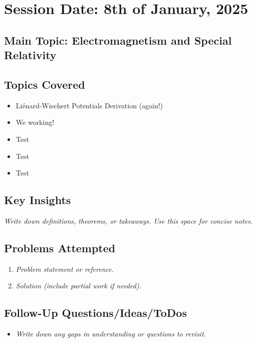 \section{Session Date: 8th of January, 2025}
\subsection*{Main Topic: Electromagnetism and Special Relativity}
\subsection*{Topics Covered}
\begin{itemize}
    \item Liénard-Wiechert Potentials Derivation (again!) 
    \item We working!
    \item Test
    \item Test
    \item Test
\end{itemize}

\subsection*{Key Insights}
\textit{Write down definitions, theorems, or takeaways. Use this space for concise notes.}

\subsection*{Problems Attempted}
\begin{enumerate}
    \item \textit{Problem statement or reference.}
    \item \textit{Solution (include partial work if needed).}
\end{enumerate}

\subsection*{Follow-Up Questions/Ideas/ToDos}
\begin{itemize}
    \item \textit{Write down any gaps in understanding or questions to revisit.}
\end{itemize}
